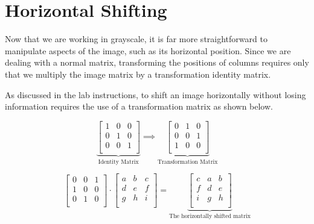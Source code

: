\section{Horizontal Shifting}

Now that we are working in grayscale, it is far more straightforward to
manipulate aspects of the image, such as its         horizontal position.
Since we are dealing with a normal matrix, transforming the positions of
columns requires only that    we multiply the image matrix by a
transformation identity matrix.

As discussed in the lab instructions, to shift an image horizontally
without
losing information requires the use of a transformation matrix as shown
below.

\[
  \underbrace{
    \begin{bmatrix}
      1&0&0\\
      0&1&0\\
      0&0&1\\
    \end{bmatrix}
  }_{\text{Identity Matrix}}
  \implies
  \underbrace{
    \begin{bmatrix}
      0&1&0\\
      0&0&1\\
      1&0&0\\
    \end{bmatrix}
  }_{\text{Transformation
  Matrix}}
\]

\[ 
  \begin{bmatrix}
    0&0&1\\
    1&0&0\\
    0&1&0\\
  \end{bmatrix}
  \cdot
  \begin{bmatrix}
    a&b&c\\
    d&e&f\\
    g&h&i\\
  \end{bmatrix}
  =
  \underbrace{
    \begin{bmatrix}
      c&a&b\\
      f&d&e\\
      i&g&h\\
    \end{bmatrix}
  }_{\text{The
    horizontally
    shifted
  matrix}}
\]

